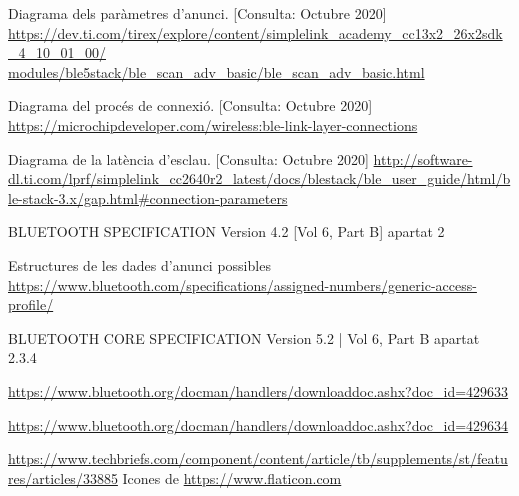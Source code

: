 \begin{thebibliography}{2}
Diagrama dels paràmetres d'anunci.
[Consulta: Octubre 2020] \newline
\href{https://dev.ti.com/tirex/explore/content/simplelink\_academy\_cc13x2\_26x2sdk\_4\_10\_01\_00/modules/ble5stack/ble\_scan\_adv\_basic/ble\_scan\_adv\_basic.html}{https://dev.ti.com/tirex/explore/content/simplelink\_academy\_cc13x2\_26x2sdk\_4\_10\_01\_00/ modules/ble5stack/ble\_scan\_adv\_basic/ble\_scan\_adv\_basic.html}

Diagrama del procés de connexió.
[Consulta: Octubre 2020] \newline
\href{https://microchipdeveloper.com/wireless:ble-link-layer-connections}{https://microchipdeveloper.com/wireless:ble-link-layer-connections}

Diagrama de la latència d'esclau.
[Consulta: Octubre 2020] \newline
\href{http://software-dl.ti.com/lprf/simplelink\_cc2640r2\_latest/docs/blestack/ble\_user\_guide/html/ble-stack-3.x/gap.html\#connection-parameters}{http://software-dl.ti.com/lprf/simplelink\_cc2640r2\_latest/docs/blestack/ble\_user\_guide/html/ble-stack-3.x/gap.html\#connection-parameters}

BLUETOOTH SPECIFICATION Version 4.2 [Vol 6, Part B] apartat 2 

Estructures de les dades d'anunci possibles \newline
\href{https://www.bluetooth.com/specifications/assigned-numbers/generic-access-profile/}{https://www.bluetooth.com/specifications/assigned-numbers/generic-access-profile/}

BLUETOOTH CORE SPECIFICATION Version 5.2 | Vol 6, Part B apartat 2.3.4

\href{https://www.bluetooth.org/docman/handlers/downloaddoc.ashx?doc_id=429633}{https://www.bluetooth.org/docman/handlers/downloaddoc.ashx?doc\_id=429633}

\href{https://www.bluetooth.org/docman/handlers/downloaddoc.ashx?doc_id=429634}{https://www.bluetooth.org/docman/handlers/downloaddoc.ashx?doc\_id=429634}


\href{https://www.techbriefs.com/component/content/article/tb/supplements/st/features/articles/33885}{https://www.techbriefs.com/component/content/article/tb/supplements/st/features/articles/33885}
Icones de \href{https://www.flaticon.com}{https://www.flaticon.com}


\end{thebibliography}
